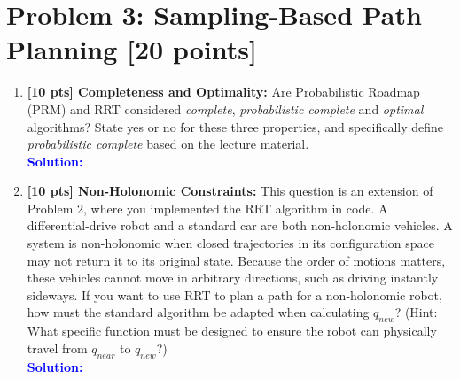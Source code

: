 \documentclass[11pt,letterpaper]{article}
\newcommand{\solutionspace}{%
  \vspace{0.2em}%
  \noindent\textbf{\textcolor{blue}{Solution:}}\par
}
\begin{document}
\section*{Problem 3: Sampling-Based Path Planning [20 points]}
\begin{enumerate}
    \item \textbf{[10 pts] Completeness and Optimality:}
    Are Probabilistic Roadmap (PRM) and RRT considered \textit{complete}, \textit{probabilistic complete} and \textit{optimal} algorithms? State yes or no for these three properties, and specifically define \textit{probabilistic complete} based on the lecture material. \\
    \solutionspace
        \vspace{0.3cm}

    \item \textbf{[10 pts] Non-Holonomic Constraints:}
    This question is an extension of Problem 2, where you implemented the RRT algorithm in code. A differential-drive robot and a standard car are both non-holonomic vehicles. A system is non-holonomic when closed trajectories in its configuration space may not return it to its original state. Because the order of motions matters, these vehicles cannot move in arbitrary directions, such as driving instantly sideways. If you want to use RRT to plan a path for a non-holonomic robot, how must the standard algorithm be adapted when calculating $q_{new}$? (Hint: What specific function must be designed to ensure the robot can physically travel from $q_{near}$ to $q_{new}$?) \\
    \solutionspace
        \vspace{0.3cm}

\end{enumerate}
\end{document}
